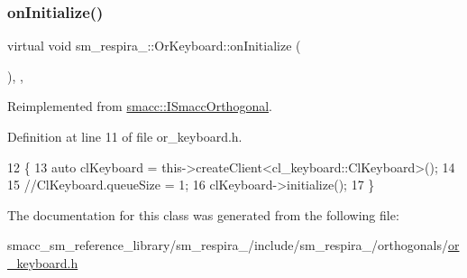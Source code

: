 \subsubsection{\texorpdfstring{on\+Initialize()}{onInitialize()}}
{\footnotesize\ttfamily virtual void sm\+\_\+respira\+\_\+::\+Or\+Keyboard\+::on\+Initialize (\begin{DoxyParamCaption}{ }\end{DoxyParamCaption})\hspace{0.3cm}{\ttfamily [inline]}, {\ttfamily [override]}, {\ttfamily [virtual]}}



Reimplemented from \hyperlink{classsmacc_1_1ISmaccOrthogonal_a6bb31c620cb64dd7b8417f8705c79c7a}{smacc\+::\+I\+Smacc\+Orthogonal}.



Definition at line 11 of file or\+\_\+keyboard.\+h.


\begin{DoxyCode}
12     \{
13         \textcolor{keyword}{auto} clKeyboard = this->createClient<cl\_keyboard::ClKeyboard>();
14         
15         \textcolor{comment}{//ClKeyboard.queueSize = 1;}
16         clKeyboard->initialize();
17     \}
\end{DoxyCode}


The documentation for this class was generated from the following file\+:\begin{DoxyCompactItemize}
\item 
smacc\+\_\+sm\+\_\+reference\+\_\+library/sm\+\_\+respira\+\_/include/sm\+\_\+respira\+\_/orthogonals/\hyperlink{sm__respira__1_2include_2sm__respira__1_2orthogonals_2or__keyboard_8h}{or\+\_\+keyboard.\+h}\end{DoxyCompactItemize}
